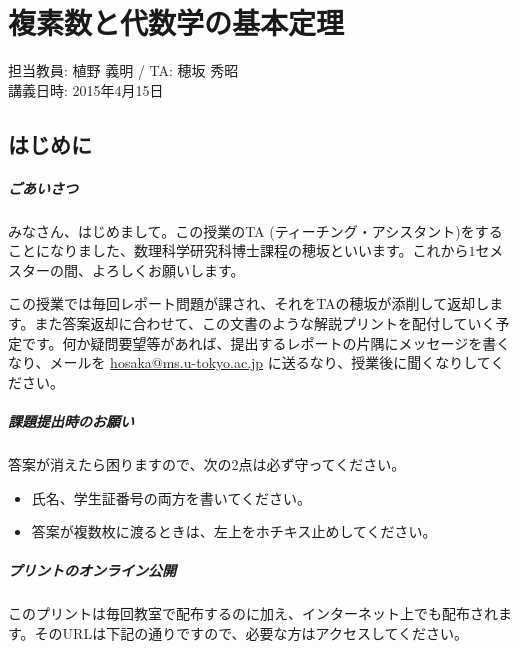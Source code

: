 \chapter{複素数と代数学の基本定理}

\begin{flushright}
担当教員: 植野 義明 / TA: 穂坂 秀昭 \\
講義日時: 2015年4月15日
\end{flushright}

\section{はじめに}

\paragraph{ごあいさつ}

みなさん、はじめまして。この授業のTA (ティーチング・アシスタント)をすることになりました、数理科学研究科博士課程の穂坂といいます。これから$1$セメスターの間、よろしくお願いします。

この授業では毎回レポート問題が課され、それをTAの穂坂が添削して返却します。また答案返却に合わせて、この文書のような解説プリントを配付していく予定です。何か疑問要望等があれば、提出するレポートの片隅にメッセージを書くなり、メールを \url{hosaka@ms.u-tokyo.ac.jp} に送るなり、授業後に聞くなりしてください。

\paragraph{課題提出時のお願い}
答案が消えたら困りますので、次の$2$点は必ず守ってください。\vspace{-0.5zw}
\begin{itemize}
\item 氏名、学生証番号の両方を書いてください。
\item 答案が複数枚に渡るときは、左上をホチキス止めしてください。
\end{itemize}

\vspace{-1zw}
\paragraph{プリントのオンライン公開}

このプリントは毎回教室で配布するのに加え、インターネット上でも配布されます。そのURLは下記の通りですので、必要な方はアクセスしてください。

